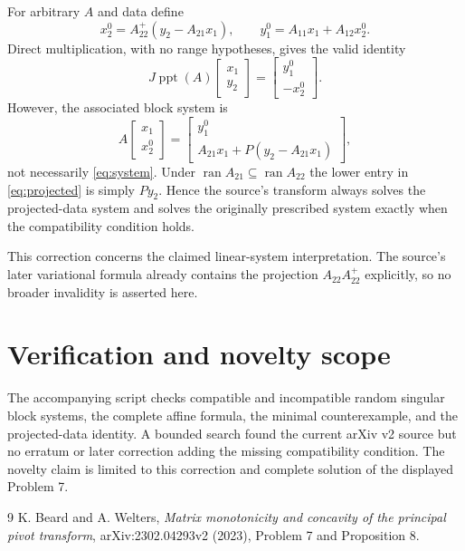 \documentclass[11pt]{article}
\newcommand{\ran}{\operatorname{ran}}
\newcommand{\ppt}{\operatorname{ppt}}
\begin{document}
For arbitrary $A$ and data define
\[
 x_2^0=A_{22}^{+}(y_2-A_{21}x_1),\qquad
 y_1^0=A_{11}x_1+A_{12}x_2^0.
\]
Direct multiplication, with no range hypotheses, gives the valid identity
\[
 J\ppt(A)\begin{bmatrix}x_1\\y_2\end{bmatrix}
 =\begin{bmatrix}y_1^0\\-x_2^0\end{bmatrix}.
\]
However, the associated block system is
\begin{equation}\label{eq:projected}
 A\begin{bmatrix}x_1\\x_2^0\end{bmatrix}
 =\begin{bmatrix}
 y_1^0\\A_{21}x_1+P(y_2-A_{21}x_1)
 \end{bmatrix},
\end{equation}
not necessarily \eqref{eq:system}.  Under
$\ran A_{21}\subseteq\ran A_{22}$ the lower entry in
\eqref{eq:projected} is simply $Py_2$.  Hence the source's transform always
solves the projected-data system and solves the originally prescribed system
exactly when the compatibility condition holds.

This correction concerns the claimed linear-system interpretation.  The
source's later variational formula already contains the projection
$A_{22}A_{22}^{+}$ explicitly, so no broader invalidity is asserted here.

\section{Verification and novelty scope}

The accompanying script checks compatible and incompatible random singular
block systems, the complete affine formula, the minimal counterexample, and
the projected-data identity.  A bounded search found the current arXiv v2
source but no erratum or later correction adding the missing compatibility
condition.  The novelty claim is limited to this correction and complete
solution of the displayed Problem 7.

\begin{thebibliography}{9}
K. Beard and A. Welters,
\emph{Matrix monotonicity and concavity of the principal pivot transform},
arXiv:2302.04293v2 (2023), Problem 7 and Proposition 8.
\end{thebibliography}
\end{document}
